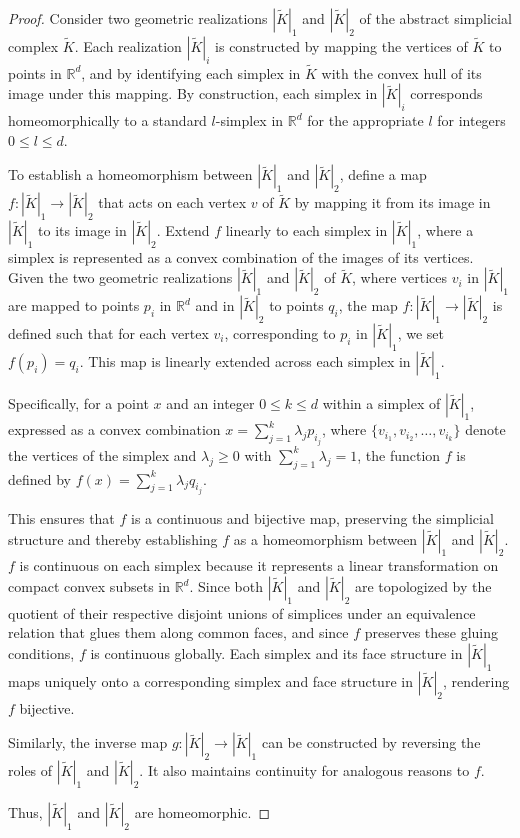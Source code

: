 \begin{proof}
	Consider two geometric realizations $|\tilde{K}|_{1}$ and $|\tilde{K}|_{2}$ of
	the abstract simplicial complex $\tilde{K}$. Each realization
	$|\tilde{K}|_{i}$ is constructed by mapping the vertices of $\tilde{K}$ to
	points in $\mathbb{R}^{d}$, and by identifying each simplex in $\tilde{K}$ with
	the convex hull of its image under this mapping. By construction, each simplex
	in $|\tilde{K}|_{i}$ corresponds homeomorphically to a standard $l$-simplex in
	$\mathbb{R}^{d}$ for the appropriate $l$ for integers $0 \leq l \leq d$.

	To establish a homeomorphism between $|\tilde{K}|_{1}$ and $|\tilde{K}|_{2}$,
	define a map $f: |\tilde{K}|_{1} \to |\tilde{K}|_{2}$ that acts on each vertex
	$v$ of $\tilde{K}$ by mapping it from its image in $|\tilde{K}|_{1}$ to its
	image in $|\tilde{K}|_{2}$. Extend $f$ linearly to each simplex in $|\tilde{K}|
	_{1}$, where a simplex is represented as a convex combination of the images of
	its vertices. Given the two geometric realizations $|\tilde{K}|_{1}$ and $|\tilde{K}|_{2}$
	of $\tilde{K}$, where vertices $v_{i}$ in $|\tilde{K}|_{1}$ are mapped to points
	$p_{i}$ in $\mathbb{R}^{d}$ and in $|\tilde{K}|_{2}$ to points $q_{i}$, the
	map $f: |\tilde{K}|_{1} \to |\tilde{K}|_{2}$ is defined such that for each
	vertex $v_{i}$, corresponding to $p_{i}$ in $|\tilde{K}|_{1}$, we set
	$f(p_{i}) = q_{i}$. This map is linearly extended across each simplex in $|\tilde
	{K}|_{1}$.

	Specifically, for a point $x$ and an integer $0 \leq k \leq d$ within a simplex of $|\tilde{K}|_{1}$, expressed
	as a convex combination $x = \sum_{j=1}^{k}\lambda_{j} p_{i_j}$,
	where $\{v_{i_1}, v_{i_2}, \ldots, v_{i_k}\}$ denote the vertices of the simplex
	and $\lambda_{j} \geq 0$ with $\sum_{j=1}^{k}\lambda_{j} = 1$, the function
	$f$ is defined by $f(x) = \sum_{j=1}^{k}\lambda_{j} q_{i_j}$.
	
	This ensures that $f$ is a continuous and bijective map, preserving
	the simplicial structure and thereby establishing $f$ as a homeomorphism between
	$|\tilde{K}|_{1}$ and $|\tilde{K}|_{2}$. $f$ is continuous on each simplex because it represents a linear transformation
	on compact convex subsets in $\mathbb{R}^{d}$. Since both $|\tilde{K}|_{1}$
	and $|\tilde{K}|_{2}$ are topologized by the quotient of their respective
	disjoint unions of simplices under an equivalence relation that glues them
	along common faces, and since $f$ preserves these gluing conditions, $f$ is
	continuous globally. Each simplex and its face structure in $|\tilde{K}|_{1}$ maps
	uniquely onto a corresponding simplex and face structure in $|\tilde{K}|_{2}$,
	rendering $f$ bijective.

	Similarly, the inverse map $g: |\tilde{K}|_{2} \to |\tilde{K}|_{1}$ can be constructed
	by reversing the roles of $|\tilde{K}|_{1}$ and $|\tilde{K}|_{2}$. It also
	maintains continuity for analogous reasons to $f$.

	Thus, $|\tilde{K}|_{1}$ and $|\tilde{K}|_{2}$ are homeomorphic.
\end{proof}

